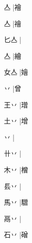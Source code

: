 \begin{multicols}{2}
{{亼{\cnjzr{}}}\mktsJzrVerticalBar{}{\cjk{}{\cnsym{}　}{\cnsym{}　}{\cnsym{}　}}|{\cjk{}襘}\par
{亼{\cnjzr{}}}\mktsJzrVerticalBar{}{\cjk{}{\cnsym{}　}{\cnsym{}　}{\cnsym{}　}}|{\cjk{}禬}\par
{\cjk{}匕亼{\cnjzr{}}}|{}\par
{亼{\cnjzr{}}}\mktsJzrVerticalBar{}{\cjk{}{\cnsym{}　}{\cnsym{}　}{\cnsym{}　}}|{\cjk{}繪}\par
{\cjk{}女亼{\cnjzr{}}}\mktsJzrVerticalBar{}{\cjk{}{\cnsym{}　}{\cnsym{}　}{\cnsym{}　}}|{\cjk{}嬒}\par
{\cjk{}{\cnsym{}　}丷{\cnjzr{}}}\mktsJzrVerticalBar{}{\cjk{}{\cnsym{}　}{\cnsym{}　}{\cnsym{}　}}|{\cjk{}曾}\par
{\cjk{}王丷{\cnjzr{}}}\mktsJzrVerticalBar{}{\cjk{}{\cnsym{}　}{\cnsym{}　}{\cnsym{}　}}|{\cjk{}璔}\par
{\cjk{}土丷{\cnjzr{}}}\mktsJzrVerticalBar{}{\cjk{}{\cnsym{}　}{\cnsym{}　}{\cnsym{}　}}|{\cjk{}增}\par
{丷{\cnjzr{}}}\mktsJzrVerticalBar{}{\cjk{}{\cnsym{}　}{\cnsym{}　}{\cnsym{}　}}|{}\par
{\cjk{}卄丷{\cnjzr{}}}\mktsJzrVerticalBar{}{\cjk{}{\cnsym{}　}{\cnsym{}　}{\cnsym{}　}}|{}\par
{\cjk{}木丷{\cnjzr{}}}\mktsJzrVerticalBar{}{\cjk{}{\cnsym{}　}{\cnsym{}　}{\cnsym{}　}}|{\cjk{}橧}\par
{\cjk{}镸丷{\cnjzr{}}}\mktsJzrVerticalBar{}{\cjk{}{\cnsym{}　}{\cnsym{}　}{\cnsym{}　}}|{}\par
{\cjk{}馬丷{\cnjzr{}}}\mktsJzrVerticalBar{}{\cjk{}{\cnsym{}　}{\cnsym{}　}{\cnsym{}　}}|{\cjk{}驓}\par
{\cjk{}鬲丷{\cnjzr{}}}\mktsJzrVerticalBar{}{\cjk{}{\cnsym{}　}{\cnsym{}　}{\cnsym{}　}}|{}\par
{\cjk{}石丷{\cnjzr{}}}\mktsJzrVerticalBar{}{\cjk{}{\cnsym{}　}{\cnsym{}　}{\cnsym{}　}}|{\cjk{}磳}\par
}
\end{multicols}
